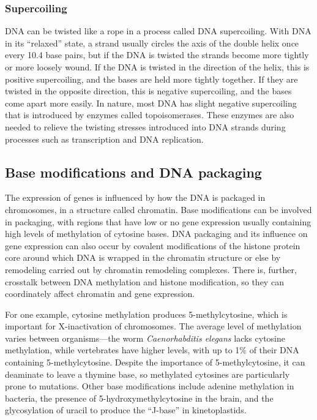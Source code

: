 \hypertarget{supercoiling}{%
\subsubsection{Supercoiling}\label{supercoiling}}

DNA can be twisted like a rope in a process called DNA supercoiling. With DNA in its ``relaxed'' state, a strand usually circles the axis of the double helix once every 10.4 base pairs, but if the DNA is twisted the strands become more tightly or more loosely wound. If the DNA is twisted in the direction of the helix, this is positive supercoiling, and the bases are held more tightly together. If they are twisted in the opposite direction, this is negative supercoiling, and the bases come apart more easily. In nature, most DNA has slight negative supercoiling that is introduced by enzymes called topoisomerases. These enzymes are also needed to relieve the twisting stresses introduced into DNA strands during processes such as transcription and DNA replication.

\hypertarget{base-modifications-and-dna-packaging}{%
\subsection{Base modifications and DNA packaging}\label{base-modifications-and-dna-packaging}}

The expression of genes is influenced by how the DNA is packaged in chromosomes, in a structure called chromatin. Base modifications can be involved in packaging, with regions that have low or no gene expression usually containing high levels of methylation of cytosine bases. DNA packaging and its influence on gene expression can also occur by covalent modifications of the histone protein core around which DNA is wrapped in the chromatin structure or else by remodeling carried out by chromatin remodeling complexes. There is, further, crosstalk between DNA methylation and histone modification, so they can coordinately affect chromatin and gene expression.

For one example, cytosine methylation produces 5-methylcytosine, which is important for X-inactivation of chromosomes. The average level of methylation varies between organisms---the worm \emph{Caenorhabditis elegans} lacks cytosine methylation, while vertebrates have higher levels, with up to 1\% of their DNA containing 5-methylcytosine. Despite the importance of 5-methylcytosine, it can deaminate to leave a thymine base, so methylated cytosines are particularly prone to mutations. Other base modifications include adenine methylation in bacteria, the presence of 5-hydroxymethylcytosine in the brain, and the glycosylation of uracil to produce the ``J-base'' in kinetoplastids.

